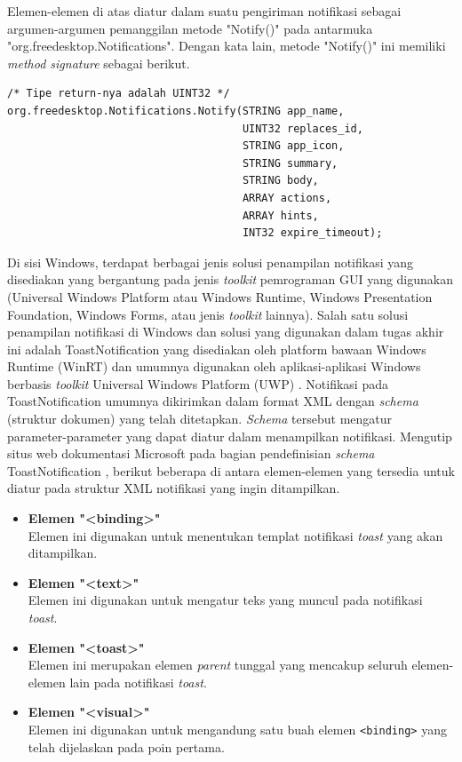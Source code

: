 Elemen-elemen di atas diatur dalam suatu pengiriman notifikasi sebagai argumen-argumen pemanggilan metode "Notify()" pada antarmuka "org.freedesktop.Notifications". Dengan kata lain, metode "Notify()" ini memiliki \textit{method signature} sebagai berikut.
\begin{lstlisting}
/* Tipe return-nya adalah UINT32 */
org.freedesktop.Notifications.Notify(STRING app_name,
                                     UINT32 replaces_id,
                                     STRING app_icon,
                                     STRING summary,
                                     STRING body,
                                     ARRAY actions,
                                     ARRAY hints,
                                     INT32 expire_timeout);
\end{lstlisting}

Di sisi Windows, terdapat berbagai jenis solusi penampilan notifikasi yang disediakan yang bergantung pada jenis \textit{toolkit} pemrograman GUI yang digunakan (Universal Windows Platform atau Windows Runtime, Windows Presentation Foundation, Windows Forms, atau jenis \textit{toolkit} lainnya). Salah satu solusi penampilan notifikasi di Windows dan solusi yang digunakan dalam tugas akhir ini adalah ToastNotification yang disediakan oleh platform bawaan Windows Runtime (WinRT) dan umumnya digunakan oleh aplikasi-aplikasi Windows berbasis \textit{toolkit} Universal Windows Platform (UWP) \cite{microsoft-toast-notification-overview}. Notifikasi pada ToastNotification umumnya dikirimkan dalam format XML dengan \textit{schema} (struktur dokumen) yang telah ditetapkan. \textit{Schema} tersebut mengatur parameter-parameter yang dapat diatur dalam menampilkan notifikasi. Mengutip situs web dokumentasi Microsoft pada bagian pendefinisian \textit{schema} ToastNotification \cite{microsoft-toast-notification-schema}, berikut beberapa di antara elemen-elemen yang tersedia untuk diatur pada struktur XML notifikasi yang ingin ditampilkan.

\begin{itemize}
    \item \textbf{Elemen "<binding>"}\\
    Elemen ini digunakan untuk menentukan templat notifikasi \textit{toast} yang akan ditampilkan.
    
    \item \textbf{Elemen "<text>"}\\
    Elemen ini digunakan untuk mengatur teks yang muncul pada notifikasi \textit{toast}.
    
    \item \textbf{Elemen "<toast>"}\\
    Elemen ini merupakan elemen \textit{parent} tunggal yang mencakup seluruh elemen-elemen lain pada notifikasi \textit{toast}.
    
    \item \textbf{Elemen "<visual>"}\\
    Elemen ini digunakan untuk mengandung satu buah elemen \verb|<binding>| yang telah dijelaskan pada poin pertama.
\end{itemize}

